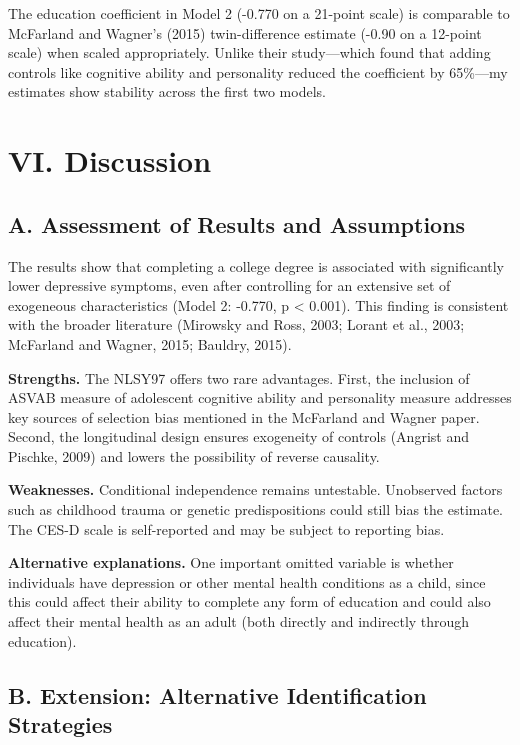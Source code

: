 \documentclass[
  12pt,
]{article}
\begin{document}
The education coefficient in Model 2 (-0.770 on a 21-point scale) is
comparable to McFarland and Wagner's (2015) twin-difference estimate
(-0.90 on a 12-point scale) when scaled appropriately. Unlike their
study---which found that adding controls like cognitive ability and
personality reduced the coefficient by 65\%---my estimates show
stability across the first two models.

\section{VI. Discussion}\label{vi.-discussion}

\subsection{A. Assessment of Results and
Assumptions}\label{a.-assessment-of-results-and-assumptions}

The results show that completing a college degree is associated with
significantly lower depressive symptoms, even after controlling for an
extensive set of exogeneous characteristics (Model 2: -0.770, p
\textless{} 0.001). This finding is consistent with the broader
literature (Mirowsky and Ross, 2003; Lorant et al., 2003; McFarland and
Wagner, 2015; Bauldry, 2015).

\textbf{Strengths.} The NLSY97 offers two rare advantages. First, the
inclusion of ASVAB measure of adolescent cognitive ability and
personality measure addresses key sources of selection bias mentioned in
the McFarland and Wagner paper. Second, the longitudinal design ensures
exogeneity of controls (Angrist and Pischke, 2009) and lowers the
possibility of reverse causality.

\textbf{Weaknesses.} Conditional independence remains untestable.
Unobserved factors such as childhood trauma or genetic predispositions
could still bias the estimate. The CES-D scale is self-reported and may
be subject to reporting bias.

\textbf{Alternative explanations.} One important omitted variable is
whether individuals have depression or other mental health conditions as
a child, since this could affect their ability to complete any form of
education and could also affect their mental health as an adult (both
directly and indirectly through education).

\subsection{B. Extension: Alternative Identification
Strategies}\label{b.-extension-alternative-identification-strategies}
\end{document}
